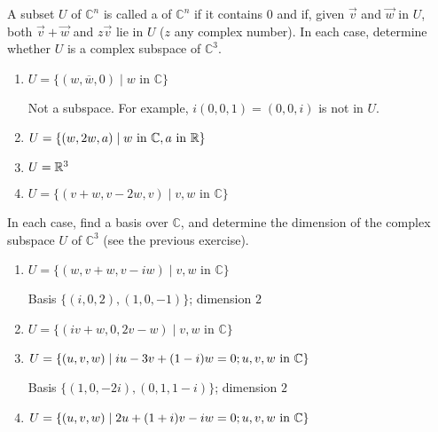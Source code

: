 \documentclass{ximera}
\begin{document}
\begin{problem}\label{prb:complex_matrices3}
A subset $U$ of $\mathbb{C}^n$ is called a  of $\mathbb{C}^n$ if it contains $0$ and if, given $\vec{v}$ and $\vec{w}$ in $U$, both $\vec{v} + \vec{w}$ and $z\vec{v}$ lie in $U$ ($z$ any complex number). In each case, determine whether $U$ is a complex subspace of $\mathbb{C}^3$.


\begin{enumerate}
\item $U = \{(w, \overline{w}, 0) \mid w \mbox{ in } \mathbb{C}\}$
\begin{hint}
Not a subspace. For example, $i(0, 0, 1) = (0, 0, i)$ is not in $U$.
\end{hint}

\item $U = \{(w, 2w, a) \mid w \mbox{ in } \mathbb{C}, a \mbox{ in } \mathbb{R}\}$

\item $U = \mathbb{R}^3$

\item $U = \{(v + w, v - 2w, v) \mid v, w \mbox{ in } \mathbb{C}\}$

\end{enumerate}
\end{problem}

\begin{problem}\label{prb:complex_matrices4}
In each case, find a basis over $\mathbb{C}$, and determine the dimension of the complex subspace $U$ of $\mathbb{C}^3$ (see the previous exercise).

\begin{enumerate}
\item $U = \{(w, v + w, v - iw) \mid v, w \mbox{ in } \mathbb{C}\}$
\begin{hint}
Basis $\{(i, 0, 2), (1, 0, -1)\}$; dimension $2$
\end{hint}

\item $U = \{(iv + w, 0, 2v - w) \mid v, w \mbox{ in } \mathbb{C}\}$

\item $U = \{(u, v, w) \mid  iu - 3v + (1 - i)w = 0;\  \\ u, v, w \mbox{ in } \mathbb{C}\}$
\begin{hint}
Basis $\{(1, 0, -2i), (0, 1, 1 - i)\}$; dimension $2$
\end{hint}

\item $U = \{(u, v, w) \mid 2u + (1 + i)v - iw = 0;\ \\ u, v, w \mbox{ in } \mathbb{C}\}$
\end{enumerate}
\end{problem}
\end{document}
